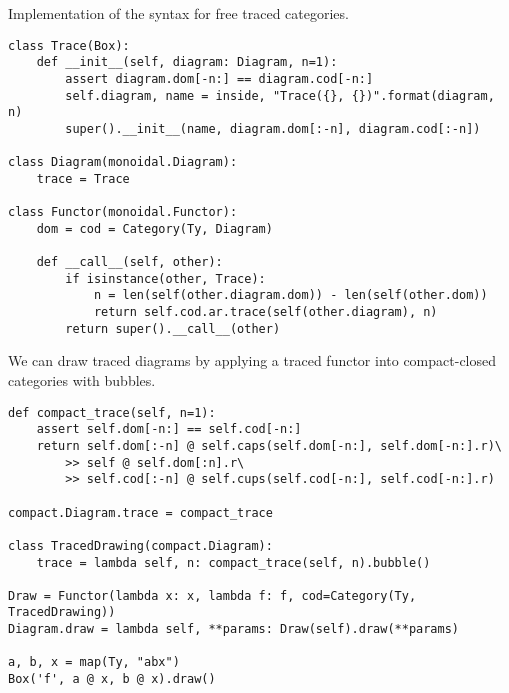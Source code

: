 \begin{python}
{\normalfont Implementation of the syntax for free traced categories.}

\begin{verbatim}
class Trace(Box):
    def __init__(self, diagram: Diagram, n=1):
        assert diagram.dom[-n:] == diagram.cod[-n:]
        self.diagram, name = inside, "Trace({}, {})".format(diagram, n)
        super().__init__(name, diagram.dom[:-n], diagram.cod[:-n])

class Diagram(monoidal.Diagram):
    trace = Trace

class Functor(monoidal.Functor):
    dom = cod = Category(Ty, Diagram)

    def __call__(self, other):
        if isinstance(other, Trace):
            n = len(self(other.diagram.dom)) - len(self(other.dom))
            return self.cod.ar.trace(self(other.diagram), n)
        return super().__call__(other)
\end{verbatim}
\end{python}

\begin{example}
We can draw traced diagrams by applying a traced functor into compact-closed categories with bubbles.

\begin{verbatim}
def compact_trace(self, n=1):
    assert self.dom[-n:] == self.cod[-n:]
    return self.dom[:-n] @ self.caps(self.dom[-n:], self.dom[-n:].r)\
        >> self @ self.dom[:n].r\
        >> self.cod[:-n] @ self.cups(self.cod[-n:], self.cod[-n:].r)

compact.Diagram.trace = compact_trace

class TracedDrawing(compact.Diagram):
    trace = lambda self, n: compact_trace(self, n).bubble()

Draw = Functor(lambda x: x, lambda f: f, cod=Category(Ty, TracedDrawing))
Diagram.draw = lambda self, **params: Draw(self).draw(**params)

a, b, x = map(Ty, "abx")
Box('f', a @ x, b @ x).draw()
\end{verbatim}
\end{example}

